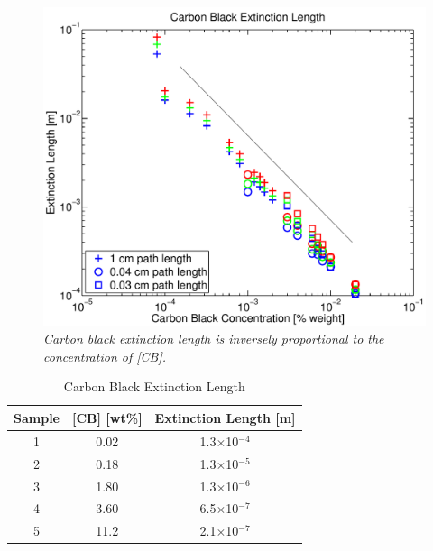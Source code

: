 \begin{figure}[htbp]
\centering
\includegraphics[width=.9\textwidth]{figures/carbonblackextinctionlength.pdf}
\caption{\label{fig:carbon-black-extinction}\emph{Carbon black extinction length is inversely proportional to the concentration of [CB].}
}
\end{figure}

\begin{table}[htbp]\footnotesize
\centering
\caption{Carbon Black Extinction Length}
\begin{center}
\begin{tabular}{c c c}
Sample & [CB] [wt\%] & Extinction Length [m] \\
\hline
1 & 0.02 & 1.3$\times$10$^{-4}$\\
2 & 0.18 & 1.3$\times$10$^{-5}$\\
3 & 1.80 & 1.3$\times$10$^{-6}$\\
4 & 3.60 & 6.5$\times$10$^{-7}$\\
5 & 11.2 & 2.1$\times$10$^{-7}$\\
\end{tabular}
\end{center}
\label{table:carbonblack}
\end{table}


